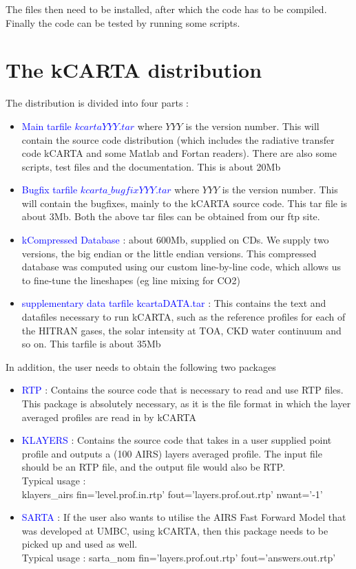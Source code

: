 \documentclass[11pt]{article}
\newcommand{\kc}{\textsf{kCARTA}\xspace}
\begin{document}
The files then need to be installed, after which the code has to be compiled. 
Finally the code can be tested by running some scripts.

\section{The \kc distribution}
The distribution is divided into four parts :
\begin{itemize}
\item \textcolor{blue} {Main tarfile $kcartaYYY.tar$} where $YYY$ is the 
version number. This will contain the source code distribution (which includes
the radiative transfer code \kc and some Matlab and Fortan readers). There are
also some scripts, test files and the documentation. This is about 20Mb\\
\item \textcolor{blue} {Bugfix tarfile $kcarta\_bugfixYYY.tar$} where $YYY$ 
is the version number. This will contain the bugfixes, mainly to the 
\kc source code. This tar file is about 3Mb. Both the above tar files can
be obtained from our ftp site.\\
\item \textcolor{blue} {kCompressed Database} : about 600Mb, supplied on 
CDs. We supply two versions, the big endian or the little endian versions. 
This compressed database was computed using our custom line-by-line code, 
which allows us to fine-tune the lineshapes (eg line mixing for CO2)\\
\item \textcolor{blue} {supplementary data tarfile kcartaDATA.tar} : This 
contains the text and datafiles necessary to run \kc, such as the reference
profiles for each of the HITRAN gases, the solar intensity at TOA, CKD water
continuum and so on. This tarfile is about 35Mb\\
\end{itemize}

In addition, the user needs to obtain the following two packages
\begin{itemize}
\item \textcolor{blue} {RTP} : Contains the source code that is necessary
to read and use RTP files. This package is absolutely necessary, as it is
the file format in which the layer averaged profiles are read in by \kc \\
\item \textcolor{blue} {KLAYERS} : Contains the source code that takes in a
user supplied point profile and outputs a (100 AIRS) layers averaged profile.
The input file should be an RTP file, and the output file would also be RTP.\\
Typical usage : \\
   klayers\_airs fin='level.prof.in.rtp' fout='layers.prof.out.rtp' nwant='-1'
\item \textcolor{blue} {SARTA} : If the user also wants to utilise the AIRS
Fast Forward Model that was developed at UMBC, using \kc, then this package
needs to be picked up and used as well.\\
Typical usage : sarta\_nom fin='layers.prof.out.rtp' fout='answers.out.rtp'
\end{itemize}
\end{document}
